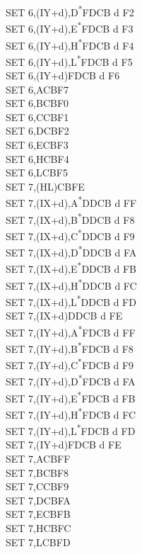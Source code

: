 \documentclass[twoside,openright,a4paper]{book}
\begin{document}
\begin{multicols}{3}
{\begin{tabbing}
	SET 6,(IY+d),D\textsuperscript{*}\>FDCB d F2\\
	SET 6,(IY+d),E\textsuperscript{*}\>FDCB d F3\\
	SET 6,(IY+d),H\textsuperscript{*}\>FDCB d F4\\
	SET 6,(IY+d),L\textsuperscript{*}\>FDCB d F5\\
	SET 6,(IY+d)\>FDCB d F6\\
	SET 6,A\>CBF7\\
	SET 6,B\>CBF0\\
	SET 6,C\>CBF1\\
	SET 6,D\>CBF2\\
	SET 6,E\>CBF3\\
	SET 6,H\>CBF4\\
	SET 6,L\>CBF5\\
	SET 7,(HL)\>CBFE\\
	SET 7,(IX+d),A\textsuperscript{*}\>DDCB d FF\\
	SET 7,(IX+d),B\textsuperscript{*}\>DDCB d F8\\
	SET 7,(IX+d),C\textsuperscript{*}\>DDCB d F9\\
	SET 7,(IX+d),D\textsuperscript{*}\>DDCB d FA\\
	SET 7,(IX+d),E\textsuperscript{*}\>DDCB d FB\\
	SET 7,(IX+d),H\textsuperscript{*}\>DDCB d FC\\
	SET 7,(IX+d),L\textsuperscript{*}\>DDCB d FD\\
	SET 7,(IX+d)\>DDCB d FE\\
	SET 7,(IY+d),A\textsuperscript{*}\>FDCB d FF\\
	SET 7,(IY+d),B\textsuperscript{*}\>FDCB d F8\\
	SET 7,(IY+d),C\textsuperscript{*}\>FDCB d F9\\
	SET 7,(IY+d),D\textsuperscript{*}\>FDCB d FA\\
	SET 7,(IY+d),E\textsuperscript{*}\>FDCB d FB\\
	SET 7,(IY+d),H\textsuperscript{*}\>FDCB d FC\\
	SET 7,(IY+d),L\textsuperscript{*}\>FDCB d FD\\
	SET 7,(IY+d)\>FDCB d FE\\
	SET 7,A\>CBFF\\
	SET 7,B\>CBF8\\
	SET 7,C\>CBF9\\
	SET 7,D\>CBFA\\
	SET 7,E\>CBFB\\
	SET 7,H\>CBFC\\
	SET 7,L\>CBFD\\

\end{tabbing}}
\end{multicols}
\end{document}
